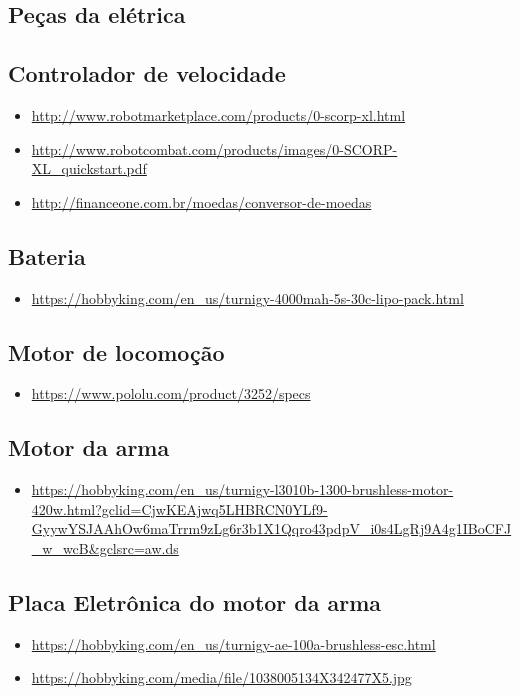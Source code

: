 \documentclass{article}
\begin{document}
\begin{appendix}
    \section{Peças da elétrica}
    \subsection{Controlador de velocidade}
    \begin{itemize}
        \item \url{http://www.robotmarketplace.com/products/0-scorp-xl.html}
        \item \url{http://www.robotcombat.com/products/images/0-SCORP-XL_quickstart.pdf}
        \item \url{http://financeone.com.br/moedas/conversor-de-moedas }
    \end{itemize}
    \subsection{Bateria}
    \begin{itemize}
        \item \url{https://hobbyking.com/en_us/turnigy-4000mah-5s-30c-lipo-pack.html }
    \end{itemize}
    \subsection{Motor de locomoção}
    \begin{itemize}
        \item \url{https://www.pololu.com/product/3252/specs}
    \end{itemize}
    \subsection{Motor da arma}
    \begin{itemize}
        \item \url{https://hobbyking.com/en_us/turnigy-l3010b-1300-brushless-motor-420w.html?gclid=CjwKEAjwq5LHBRCN0YLf9-GyywYSJAAhOw6maTrrm9zLg6r3b1X1Qqro43pdpV_i0s4LgRj9A4g1IBoCFJ_w_wcB&gclsrc=aw.ds}
    \end{itemize}
    \subsection{Placa Eletrônica do motor da arma}
    \begin{itemize}
        \item \url{https://hobbyking.com/en_us/turnigy-ae-100a-brushless-esc.html}
        \item \url{https://hobbyking.com/media/file/1038005134X342477X5.jpg}
    \end{itemize}


\end{appendix}
\end{document}
